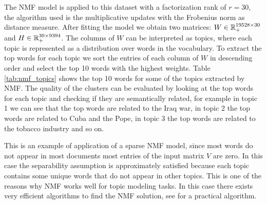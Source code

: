 The NMF model is applied to this dataset with a factorization rank of $r = 30$, the algorithm used is the multiplicative updates with the Frobenius norm as distance measure.
After fitting the model we obtain two matrices: $W \in \mathbb{R}_+^{19528 \times 30}$ and $H \in \mathbb{R}_+^{30 \times 9394}$.
The columns of $W$ can be interpreted as topics, where each topic is represented as a distribution over words in the vocabulary.
To extract the top words for each topic we sort the entries of each column of $W$ in descending order and select the top 10 words with the highest weights.
Table \ref{tab:nmf_topics} shows the top 10 words for some of the topics extracted by NMF.
The quality of the clusters can be evaluated by looking at the top words for each topic and checking if they are semantically related, for example in topic 1 we can see that the top words are related to the Iraq war, in topic 2 the top words are related to Cuba and the Pope, in topic 3 the top words are related to the tobacco industry and so on.
\par
This is an example of application of a sparse NMF model, since most words do not appear in most documents most entries of the input matrix $V$ are zero.
In this case the separability assumption is approximately satisfied because each topic contains some unique words that do not appear in other topics.
This is one of the reasons why NMF works well for topic modeling tasks.
In this case there exists very efficient algorithms to find the NMF solution, see \cite{arora2013practical} for a practical algorithm.

